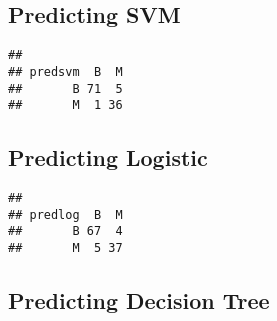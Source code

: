 \documentclass[]{article}
\newenvironment{Shaded}{\begin{snugshade}}{\end{snugshade}}
\newcommand{\DataTypeTok}[1]{\textcolor[rgb]{0.13,0.29,0.53}{#1}}
\newcommand{\KeywordTok}[1]{\textcolor[rgb]{0.13,0.29,0.53}{\textbf{#1}}}
\newcommand{\NormalTok}[1]{#1}
\newcommand{\OperatorTok}[1]{\textcolor[rgb]{0.81,0.36,0.00}{\textbf{#1}}}
\newcommand{\StringTok}[1]{\textcolor[rgb]{0.31,0.60,0.02}{#1}}
\begin{document}
\hypertarget{predicting-svm}{%
\subsection{Predicting SVM}\label{predicting-svm}}

\begin{Shaded}
\end{Shaded}

\begin{verbatim}
##        
## predsvm  B  M
##       B 71  5
##       M  1 36
\end{verbatim}

\hypertarget{predicting-logistic}{%
\subsection{Predicting Logistic}\label{predicting-logistic}}

\begin{Shaded}
\end{Shaded}

\begin{verbatim}
##        
## predlog  B  M
##       B 67  4
##       M  5 37
\end{verbatim}

\hypertarget{predicting-decision-tree}{%
\subsection{Predicting Decision Tree}\label{predicting-decision-tree}}

\begin{Shaded}
\end{Shaded}
\end{document}
